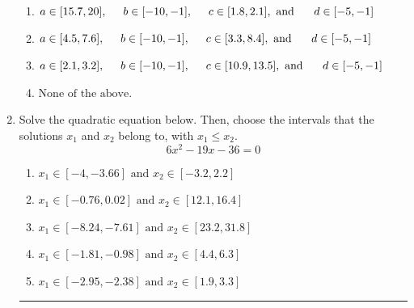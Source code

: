 \documentclass[14pt]{extbook}
\newcommand{\litem}[1]{\item#1\hspace*{-1cm}\rule{\textwidth}{0.4pt}}
\begin{document}
\begin{enumerate}
{\begin{enumerate}[label=\Alph*.]
\item \( a \in [15.7, 20], \hspace*{5mm} b \in [-10, -1], \hspace*{5mm} c \in [1.8, 2.1], \text{ and } \hspace*{5mm} d \in [-5, -1] \)
\item \( a \in [4.5, 7.6], \hspace*{5mm} b \in [-10, -1], \hspace*{5mm} c \in [3.3, 8.4], \text{ and } \hspace*{5mm} d \in [-5, -1] \)
\item \( a \in [2.1, 3.2], \hspace*{5mm} b \in [-10, -1], \hspace*{5mm} c \in [10.9, 13.5], \text{ and } \hspace*{5mm} d \in [-5, -1] \)
\item \( \text{None of the above.} \)

\end{enumerate} }
\litem{
Solve the quadratic equation below. Then, choose the intervals that the solutions $x_1$ and $x_2$ belong to, with $x_1 \leq x_2$.\[ 6x^{2} -19 x -36 = 0 \]\begin{enumerate}[label=\Alph*.]
\item \( x_1 \in [-4, -3.66] \text{ and } x_2 \in [-3.2, 2.2] \)
\item \( x_1 \in [-0.76, 0.02] \text{ and } x_2 \in [12.1, 16.4] \)
\item \( x_1 \in [-8.24, -7.61] \text{ and } x_2 \in [23.2, 31.8] \)
\item \( x_1 \in [-1.81, -0.98] \text{ and } x_2 \in [4.4, 6.3] \)
\item \( x_1 \in [-2.95, -2.38] \text{ and } x_2 \in [1.9, 3.3] \)


\end{enumerate}}
\end{enumerate}
\end{document}
